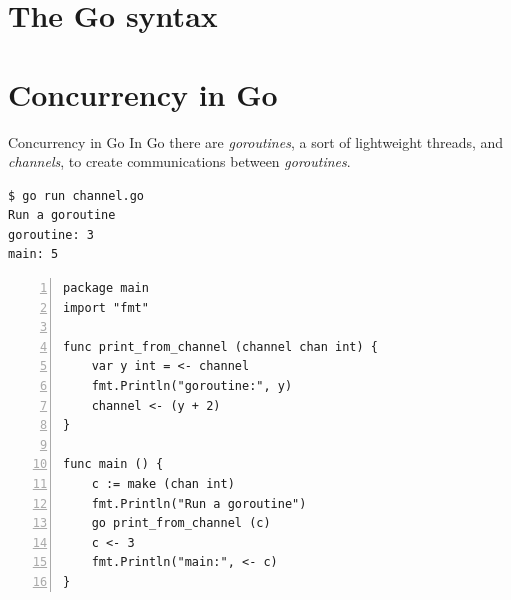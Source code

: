 \documentclass{beamer}
\begin{document}
\section{The Go syntax}



\section{Concurrency in Go}
\begin{frame}[fragile]{Concurrency in Go}
    In Go there are \emph{goroutines}, a sort of lightweight threads, and \emph{channels}, to create communications between \emph{goroutines}.
    \begin{lstlisting}[language=bash]
$ go run channel.go
Run a goroutine
goroutine: 3
main: 5
    \end{lstlisting}
    \begin{lstlisting}[language=Golang, caption={channel.go}, captionpos=b, numbers=left]
package main
import "fmt"

func print_from_channel (channel chan int) {
	var y int = <- channel
	fmt.Println("goroutine:", y)
	channel <- (y + 2)
}

func main () {
	c := make (chan int)
	fmt.Println("Run a goroutine")
	go print_from_channel (c)
	c <- 3
	fmt.Println("main:", <- c)
}
    \end{lstlisting}

\end{frame}
\end{document}
